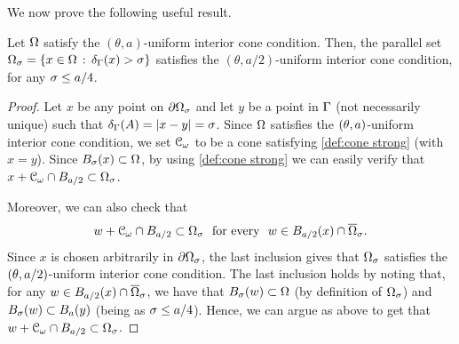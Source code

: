 \documentclass[a4paper,10pt]{amsart}
\numberwithin{equation}{section}
\begin{document}
We now prove the following useful result.
\begin{lem}
\label{lem:conoparallel}
	Let $\Omega$ satisfy the $(\theta, a )$-uniform interior cone condition. Then, the parallel set $\Omega_\sigma=\left\{ x\in \Omega  \, : \, \delta_{\Gamma}(x) > \sigma \right\}$ satisfies the $(\theta, a/2 )$-uniform interior cone condition, for any $\sigma\le a/4$.
\end{lem}
\begin{proof}
	Let $x$ be any point on $\partial \Omega_\sigma$ and let $y $ be a point in $\Gamma$ (not necessarily unique) such that $\delta_{\Gamma}(A)=|x-y| = \sigma$. Since $\Omega$ satisfies the $(\theta, a )$-uniform interior cone condition, we set $\mathcal{C}_{\omega}$ to be a cone satisfying \eqref{def:cone strong} (with $x=y$).
	Since $B_\sigma (x)\subset\Omega$, by using \eqref{def:cone strong} we can easily verify that $x+\mathcal{C}_{\omega}\cap B_{a/2} \subset \Omega_\sigma$.
\par
Moreover, we can also check that
	\begin{equation*}
\label{eq:stepconoparallel}
		w +\cC_{\om}\cap B_{a/2} \subset \Om_\si \ \text{ for every } \ w \in B_{a/2} (x) \cap \ol{\Om}_\si .
	\end{equation*}
Since $x$ is chosen arbitrarily in $\partial \Omega_\sigma$, the last inclusion gives that $\Omega_\sigma$ satisfies the $(\theta, a/2 )$-uniform interior cone condition.
The last inclusion holds by noting that,
for any $w\in B_{a/2}(x) \cap \overline{\Omega}_\sigma$, we have that $B_\sigma(w)\subset\Omega$ (by definition of $\Omega_\sigma$) and $B_\sigma(w) \subset B_a (y)$ (being as $\sigma \le a/4$). Hence, we can argue as above to get that $w +\mathcal{C}_{\omega}\cap B_{a/2} \subset \Omega_\sigma$.
\end{proof}
\end{document}
